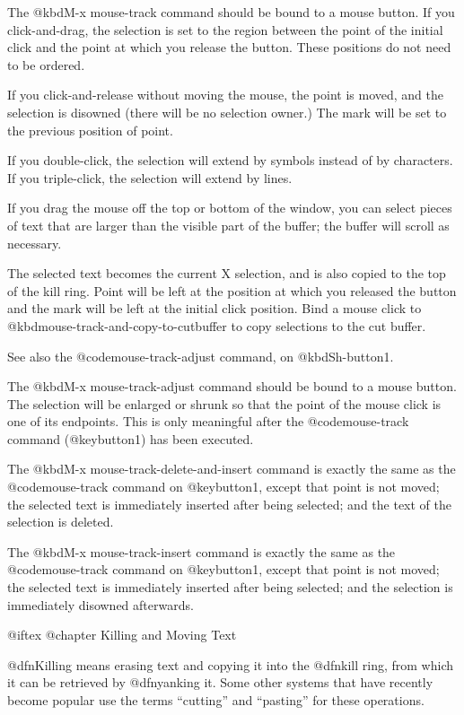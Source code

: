 {{{The @kbd{M-x mouse-track} command should be bound to a mouse button.  If
you click-and-drag, the selection is set to the region between the
point of the initial click and the point at which you release the
button.  These positions do not need to be ordered. 

If you click-and-release without moving the mouse, the point is moved,
and the selection is disowned (there will be no selection owner.)  The
mark will be set to the previous position of point.

If you double-click, the selection will extend by symbols instead of by
characters.  If you triple-click, the selection will extend by lines.

If you drag the mouse off the top or bottom of the window, you can
select pieces of text that are larger than the visible part of the
buffer; the buffer will scroll as necessary.

The selected text becomes the current X selection, and is also copied to
the top of the kill ring.  Point will be left at the position at
which you released the button and the mark will be left at the initial
click position.  Bind a mouse click to @kbd{mouse-track-and-copy-to-cutbuffer} to copy
selections to the cut buffer.

See also the @code{mouse-track-adjust} command, on @kbd{Sh-button1}.

The @kbd{M-x mouse-track-adjust} command should be bound to a mouse
button.  The selection will be enlarged or shrunk so that the point of
the mouse click is one of its endpoints.  This is only meaningful
after the @code{mouse-track} command (@key{button1}) has been executed.

The @kbd{M-x mouse-track-delete-and-insert} command is exactly the same
as the @code{mouse-track} command on @key{button1}, except that point is
not moved; the selected text is immediately inserted after being
selected; and the text of the selection is deleted.

The @kbd{M-x mouse-track-insert} command is exactly the same as the
@code{mouse-track} command on @key{button1}, except that point is not moved;
the selected text is immediately inserted after being selected; and the
selection is immediately disowned afterwards.

@iftex
@chapter Killing and Moving Text

  @dfn{Killing} means erasing text and copying it into the @dfn{kill ring},
from which it can be retrieved by @dfn{yanking} it.  Some other systems
that have recently become popular use the terms ``cutting'' and ``pasting''
for these operations.

}}}
